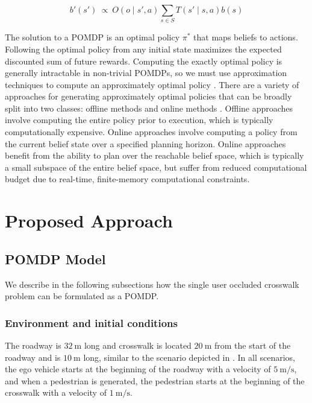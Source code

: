 \documentclass[conference]{IEEEtran}
\begin{document}
\begin{equation}
    b'(s')~\propto~O(o \mid s', a) \sum_{s \in S} T(s' \mid s, a) b(s)
\end{equation}

The solution to a POMDP is an optimal policy $\pi^*$ that maps beliefs to actions. Following the optimal policy from any initial state maximizes the expected discounted sum of future rewards. Computing the exactly optimal policy is generally intractable in non-trivial POMDPs, so we must use approximation techniques to compute an approximately optimal policy \cite{Madani2003OnProblems}. There are a variety of approaches for generating approximately optimal policies that can be broadly split into two classes: offline methods and online methods \cite{Kochenderfer2015DecisionApplication}. Offline approaches involve computing the entire policy prior to execution, which is typically computationally expensive. Online approaches involve computing a policy from the current belief state over a specified planning horizon. Online approaches benefit from the ability to plan over the reachable belief space, which is typically a small subspace of the entire belief space, but suffer from reduced computational budget due to real-time, finite-memory computational constraints.


\section{Proposed Approach}
\label{sec:proposed-approach}

\subsection{POMDP Model}

We describe in the following subsections how the single user occluded crosswalk problem can be formulated as a POMDP.

\subsubsection{Environment and initial conditions}
The roadway is $32 ~\si{\meter}$ long and crosswalk is located $20 ~\si{\meter}$ from the start of the roadway and is $10 ~\si{\meter}$ long, similar to the scenario depicted in . In all scenarios, the ego vehicle starts at the beginning of the roadway with a velocity of $5 ~\si{\meter\per\second}$, and when a pedestrian is generated, the pedestrian starts at the beginning of the crosswalk with a velocity of $1 ~\si{\meter\per\second}$.
\end{document}
